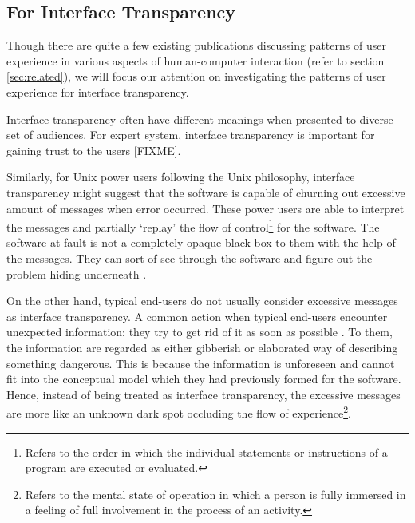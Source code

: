 \documentclass{acm_proc_article-sp}
\begin{document}
\subsection{For Interface Transparency}


Though there are quite a few existing publications discussing patterns
of user experience in various aspects of human-computer interaction
(refer to section \ref{sec:related}), we will focus our attention on
investigating the patterns of user experience for interface
transparency.

Interface transparency often have different meanings when presented to
diverse set of audiences. For expert system, interface transparency is
important for gaining trust to the users [FIXME].

Similarly, for Unix power users following the Unix philosophy,
interface transparency might suggest that the software is capable of
churning out excessive amount of messages when error occurred. These
power users are able to interpret the messages and partially `replay'
the flow of control\footnote{Refers to the order in which the
  individual statements or instructions of a program are executed or
  evaluated.}  for the software. The software at fault is not a
completely opaque black box to them with the help of the
messages. They can sort of see through the software and figure out the
problem hiding underneath \citep{unix:raymond}.

On the other hand, typical end-users do not usually consider excessive
messages as interface transparency. A common action when typical
end-users encounter unexpected information: they try to get rid of it
as soon as possible \citep{oldnew:chen}. To them, the information are
regarded as either gibberish or elaborated way of describing something
dangerous. This is because the information is unforeseen and cannot
fit into the conceptual model which they had previously formed for the
software. Hence, instead of being treated as interface transparency,
the excessive messages are more like an unknown dark spot occluding
the flow of experience\footnote{Refers to the mental state of
  operation in which a person is fully immersed in a feeling of full
  involvement in the process of an activity.}.
\end{document}
